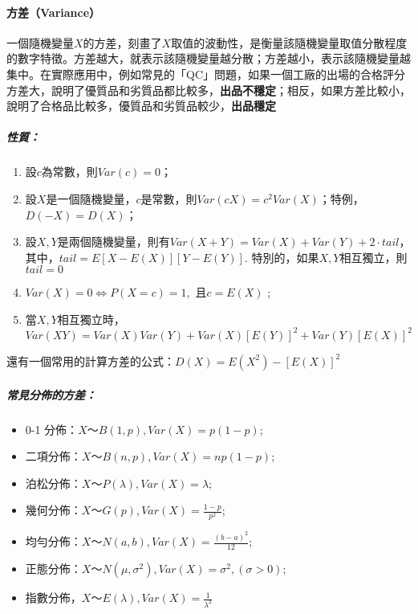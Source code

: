 \documentclass[11pt]{article}
\providecommand{\tightlist}{%
      \setlength{\itemsep}{0pt}\setlength{\parskip}{0pt}}
\begin{document}
    \hypertarget{ux65b9ux5deevariance}{%
\paragraph{方差（Variance）}\label{ux65b9ux5deevariance}}

一個隨機變量\(X\)的方差，刻畫了\(X\)取值的波動性，是衡量該隨機變量取值分散程度的數字特徵。方差越大，就表示該隨機變量越分散；方差越小，表示該隨機變量越集中。在實際應用中，例如常見的「QC」問題，如果一個工廠的出場的合格評分方差大，說明了優質品和劣質品都比較多，\textbf{出品不穩定}；相反，如果方差比較小，說明了合格品比較多，優質品和劣質品較少，\textbf{出品穩定}

    \hypertarget{ux6027ux8cea}{%
\subparagraph{性質：}\label{ux6027ux8cea}}

\begin{enumerate}
\def\labelenumi{\arabic{enumi}.}
\tightlist
\item
  設\(c\)為常數，則\(Var(c) = 0\)；
\item
  設\(X\)是一個隨機變量，\(c\)是常數，則\(Var(cX) = c^2 Var(X)\)；特例，\(D(-X) = D(X)\)；
\item
  設\(X, Y\)是兩個隨機變量，則有\(Var(X + Y) = Var(X) + Var(Y) + 2\cdot tail\)，其中，\(tail = E[X-E(X)][Y-E(Y)]\).
  特別的，如果\(X, Y\)相互獨立，則\(tail = 0\)
\item
  \(Var(X) = 0 \Leftrightarrow P(X = c) =1,\) 且\(c = E(X)\) ;
\item
  當\(X, Y\)相互獨立時，\(Var(XY) = Var(X)Var(Y) + Var(X)[E(Y)]^2 +Var(Y)[E(X)]^2\)
\end{enumerate}

還有一個常用的計算方差的公式：\(D(X) = E(X^2) - [E(X)]^2\)

    \hypertarget{ux5e38ux898bux5206ux4f48ux7684ux65b9ux5dee}{%
\subparagraph{常見分佈的方差：}\label{ux5e38ux898bux5206ux4f48ux7684ux65b9ux5dee}}

\begin{itemize}
\tightlist
\item
  0-1 分佈：\(X～B(1,p), Var(X) = p(1-p)\);
\item
  二項分佈：\(X～B(n,p), Var(X) = np(1-p)\);
\item
  泊松分佈：\(X～P(\lambda), Var(X) = \lambda\);
\item
  幾何分佈：\(X～G(p), Var(X) = \frac{1-p}{p^2}\);
\item
  均勻分佈：\(X～N(a, b), Var(X) = \frac{(b-a)^2}{12}\);
\item
  正態分佈：\(X～N(\mu, \sigma^2), Var(X) = \sigma^2, (\sigma > 0)\);
\item
  指數分佈，\(X～E(\lambda), Var(X) = \frac{1}{\lambda^2}\)
\end{itemize}
\end{document}

